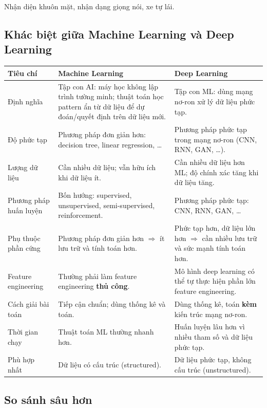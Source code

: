 \begin{vidu}[title={Ví dụ deep learning}]
Nhận diện khuôn mặt, nhận dạng giọng nói, xe tự lái.
\end{vidu}

\subsection{Khác biệt giữa Machine Learning và Deep Learning}

\begin{vidu}[title={Bảng so sánh}]
\begin{tabularx}{\linewidth}{>{\raggedright\arraybackslash}p{2.6cm}XX}
\textbf{Tiêu chí} & \textbf{Machine Learning} & \textbf{Deep Learning} \\
\midrule
Định nghĩa &
Tập con AI: máy học không lập trình tường minh; thuật toán học pattern ẩn từ dữ liệu để dự đoán/quyết định trên dữ liệu mới. &
Tập con ML: dùng mạng nơ-ron xử lý dữ liệu phức tạp. \\
Độ phức tạp &
Phương pháp đơn giản hơn: decision tree, linear regression, \ldots &
Phương pháp phức tạp trong mạng nơ-ron (CNN, RNN, GAN, \ldots). \\
Lượng dữ liệu &
Cần nhiều dữ liệu; vẫn hữu ích khi dữ liệu ít. &
Cần nhiều dữ liệu hơn ML; độ chính xác tăng khi dữ liệu tăng. \\
Phương pháp huấn luyện &
Bốn hướng: supervised, unsupervised, semi-supervised, reinforcement. &
Phương pháp phức tạp: CNN, RNN, GAN, \ldots \\
Phụ thuộc phần cứng &
Phương pháp đơn giản hơn $\Rightarrow$ ít lưu trữ và tính toán hơn. &
Phức tạp hơn, dữ liệu lớn hơn $\Rightarrow$ cần nhiều lưu trữ và sức mạnh tính toán hơn. \\
Feature engineering &
Thường phải làm feature engineering \textbf{thủ công}. &
Mô hình deep learning có thể tự thực hiện phần lớn feature engineering. \\
Cách giải bài toán &
Tiếp cận chuẩn; dùng thống kê và toán. &
Dùng thống kê, toán \textbf{kèm} kiến trúc mạng nơ-ron. \\
Thời gian chạy &
Thuật toán ML thường nhanh hơn. &
Huấn luyện lâu hơn vì nhiều tham số và dữ liệu phức tạp. \\
Phù hợp nhất &
Dữ liệu có cấu trúc (structured). &
Dữ liệu phức tạp, không cấu trúc (unstructured). \\
\end{tabularx}
\end{vidu}

\subsection{So sánh sâu hơn}

